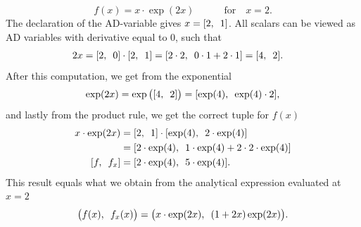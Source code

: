 \begin{equation}
    \label{eq:forwardADExample}
    f(x) = x\cdot\exp(2x) \hspace{3em} \text{for}\hspace{1em} x = 2.
\end{equation}
The declaration of the AD-variable gives $x = [2 ,\hspace{0.5em}  1]$. All scalars can be viewed as AD variables with derivative equal to 0, such that
\begin{align*}
    2x &= [ \adpair{2}{0}  ]\cdot [ \adpair{2}{1} ] %
    =[ \adpair{2\cdot2}{0\cdot1 + 2\cdot 1}  ]%
    =[ \adpair{4}{2} ].
\end{align*}
After this computation, we get from the exponential
\begin{align*}
    \exp(2x) = \exp\big([ 4,\hspace{0.5em}2 ]\big)
    = [ \exp(4),\hspace{0.5em}\exp(4)\cdot 2 ],
\end{align*}
and lastly from the product rule, we get the correct tuple for $f(x)$
\begin{align*}
    x\cdot \exp(2x) &= [\adpair{2}{1}]\cdot [\adpair{\exp(4)}{2\cdot\exp(4)}]\\
    &=[\adpair{2\cdot\exp(4)}{1\cdot\exp(4) + 2\cdot 2\cdot\exp(4)}]\\
    [\adpair{f}{f_x}] & = [ \adpair{2\cdot\exp(4)}{5\cdot\exp(4)}].
\end{align*}
This result equals what we obtain from the analytical expression evaluated at $x=2$
\begin{equation*}
    \big(f(x),\hspace{0.5em}f_x(x)\big) = \big(x\cdot\exp(2x),\hspace{0.5em}(1+2x)\exp(2x)\big).
\end{equation*}


